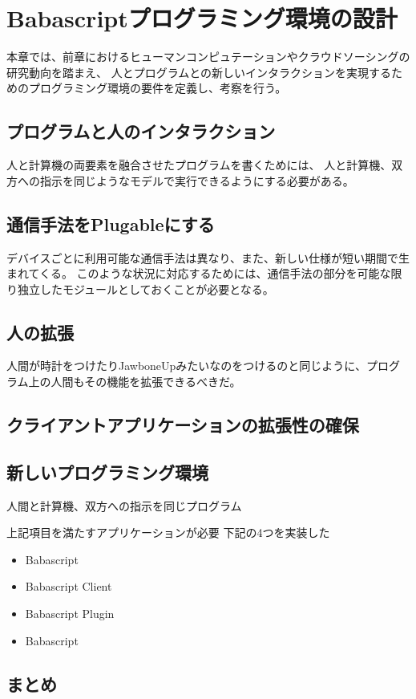 \chapter{Babascriptプログラミング環境の設計}
\label{chap:design}

本章では、前章におけるヒューマンコンピュテーションやクラウドソーシングの研究動向を踏まえ、
人とプログラムとの新しいインタラクションを実現するためのプログラミング環境の要件を定義し、考察を行う。

\section{プログラムと人のインタラクション}\label{ux30d7ux30edux30b0ux30e9ux30e0ux3068ux4ebaux306eux30a4ux30f3ux30bfux30e9ux30afux30b7ux30e7ux30f3}

人と計算機の両要素を融合させたプログラムを書くためには、
人と計算機、双方への指示を同じようなモデルで実行できるようにする必要がある。

\section{通信手法をPlugableにする}\label{ux901aux4fe1ux624bux6cd5ux3092plugableux306bux3059ux308b}

デバイスごとに利用可能な通信手法は異なり、また、新しい仕様が短い期間で生まれてくる。
このような状況に対応するためには、通信手法の部分を可能な限り独立したモジュールとしておくことが必要となる。

\section{人の拡張}\label{ux4ebaux306eux62e1ux5f35}

人間が時計をつけたりJawboneUpみたいなのをつけるのと同じように、プログラム上の人間もその機能を拡張できるべきだ。

\section{クライアントアプリケーションの拡張性の確保}\label{ux30afux30e9ux30a4ux30a2ux30f3ux30c8ux30a2ux30d7ux30eaux30b1ux30fcux30b7ux30e7ux30f3ux306eux62e1ux5f35ux6027ux306eux78baux4fdd}

\section{新しいプログラミング環境}\label{ux65b0ux3057ux3044ux30d7ux30edux30b0ux30e9ux30dfux30f3ux30b0ux74b0ux5883}

人間と計算機、双方への指示を同じプログラム

上記項目を満たすアプリケーションが必要 下記の4つを実装した

\begin{itemize}
\itemsep1pt\parskip0pt
\item
  Babascript
\item
  Babascript Client
\item
  Babascript Plugin
\item
  Babascript
\end{itemize}

\section{まとめ}\label{ux307eux3068ux3081}

